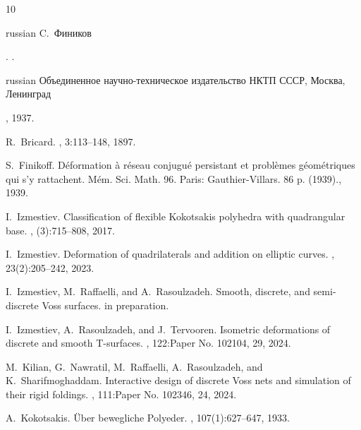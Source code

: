 \documentclass{amsart}
\theoremstyle{definition}
\begin{document}
\begin{thebibliography}{10}

\begin{otherlanguage*}{russian} C.~Фиников~\end{otherlanguage*}.
.
\newblock \begin{otherlanguage*}{russian} Объединенное
  научно-техническое издательство НКТП
  СССР, Москва, Ленинград \end{otherlanguage*}, 1937.

R.~Bricard.
, 3:113--148, 1897.

S.~Finikoff.
\newblock D{\'e}formation {\`a} r{\'e}seau conjugu{\'e} persistant et
  probl{\`e}mes g{\'e}om{\'e}triques qui s'y rattachent.
\newblock M{\'e}m. {Sci}. {Math}. 96. {Paris}: {Gauthier}-{Villars}. 86 p.
  (1939)., 1939.

I.~Izmestiev.
\newblock Classification of flexible {K}okotsakis polyhedra with quadrangular
  base.
, (3):715--808, 2017.

I.~Izmestiev.
\newblock Deformation of quadrilaterals and addition on elliptic curves.
, 23(2):205--242, 2023.

I.~Izmestiev, M.~Raffaelli, and A.~Rasoulzadeh.
\newblock Smooth, discrete, and semi-discrete {V}oss surfaces.
\newblock in preparation.

I.~Izmestiev, A.~Rasoulzadeh, and J.~Tervooren.
\newblock Isometric deformations of discrete and smooth {T}-surfaces.
, 122:Paper No. 102104, 29, 2024.

M.~Kilian, G.~Nawratil, M.~Raffaelli, A.~Rasoulzadeh, and K.~Sharifmoghaddam.
\newblock Interactive design of discrete {V}oss nets and simulation of their
  rigid foldings.
, 111:Paper No. 102346, 24, 2024.

A.~Kokotsakis.
\newblock \"{U}ber bewegliche {P}olyeder.
, 107(1):627--647, 1933.


\end{thebibliography}
\end{document}
